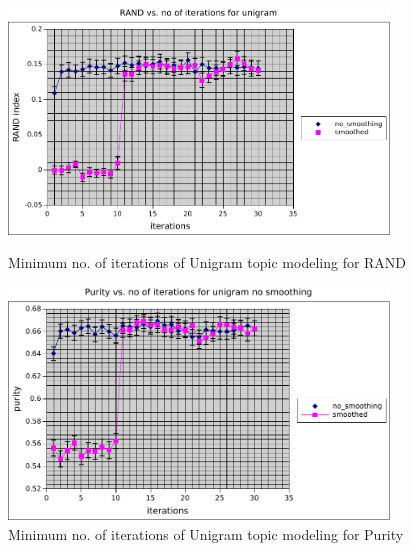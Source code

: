 \begin{figure}
    \centering
    \begin{minipage}{0.45\textwidth}
        \centering
        \includegraphics[width=0.9\textwidth]{fig/rand_k0iter_umm.pdf}
        \label{fig:rn_it_umm}
        \caption{Minimum no. of iterations of Unigram topic modeling for RAND}
    \end{minipage}\hfill
    \begin{minipage}{0.45\textwidth}
        \centering
        \includegraphics[width=0.9\textwidth]{fig/purity_k0iter_umm.pdf}
        \caption{Minimum no. of iterations of Unigram topic modeling for Purity}
    \end{minipage}
\end{figure}
